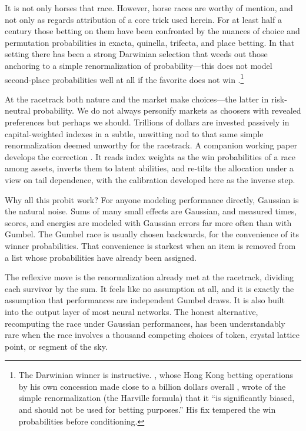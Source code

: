 \documentclass[12pt]{article}
\theoremstyle{remark}
\begin{document}
It is not only horses that race. However, horse races are worthy of mention, and not only as regards attribution of a core trick used herein. For at least half a century those betting on them have been confronted by the nuances of choice and permutation probabilities in exacta, quinella, trifecta, and place betting. In that setting there has been a strong Darwinian selection that weeds out those anchoring to a simple renormalization of probability---this does not model second-place probabilities well at all if the favorite does not win \citep{henery1981,lo1994}.\footnote{The
Darwinian winner is instructive. \citet{benter1994}, whose Hong Kong
betting operations by his own concession made close to a billion
dollars overall \citep{chellel2018}, wrote of the simple
renormalization (the Harville formula) that it ``is significantly
biased, and should not be used for betting purposes.'' His fix
tempered the win probabilities before conditioning.}

At the racetrack both nature and the market make choices---the latter in risk-neutral probability. We do not always personify markets as choosers with revealed preferences but perhaps we should. 
Trillions of dollars are invested passively in capital-weighted indexes in a subtle, unwitting nod to that same simple renormalization deemed unworthy for the racetrack.
A companion working paper develops the correction
\citep{cotton2026polish}. It reads index weights as the win
probabilities of a race among assets, inverts them to latent abilities,
and re-tilts the allocation under a view on tail dependence, with the
calibration developed here as the inverse step.

Why all this probit work? For anyone modeling performance directly,
Gaussian is the natural noise. Sums of many small effects are Gaussian,
and measured times, scores, and energies are modeled with Gaussian
errors far more often than with Gumbel. The Gumbel race is usually chosen backwards,
for the convenience of its winner probabilities. That convenience is
starkest when an item is removed from a list whose probabilities have
already been assigned.

The reflexive move is the renormalization already met at the
racetrack, dividing each survivor by the sum. It
feels like no assumption at all, and it is exactly the assumption that
performances are independent Gumbel draws. It is also built into the
output layer of most neural networks. The honest alternative,
recomputing the race under Gaussian performances, has been
understandably rare when the race involves a thousand competing choices
of token, crystal lattice point, or segment of the sky.
\end{document}
